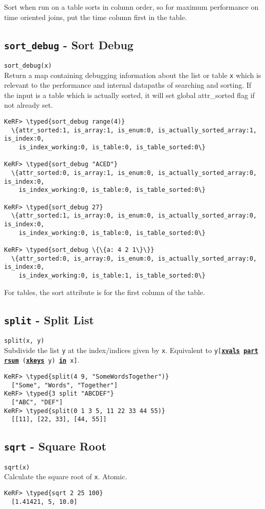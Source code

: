 \documentclass{article}
\newcommand{\typed}[1]{\textcolor{TealBlue}{#1}}
\newcommand{\primdefu}[3]{\subsection{\texttt{#1} - #2}\label{prim:#3}}
\newcommand{\primu}[2]{\hyperref[prim:#2]{\textbf{\texttt{#1}}}}
\newcommand{\primdef}[2]{\primdefu{#1}{#2}{#1}}
\newcommand{\prim}[1]{\primu{#1}{#1}}
\begin{document}
Sort when run on a table sorts in column order, so for maximum performance on time oriented joins, put the time column first in the table.

\pagebreak
\primdefu{sort\_debug}{Sort Debug}{sortDebug}
\texttt{sort\_debug(x)}\\

Return a map containing debugging information about the list or table \texttt{x} which is relevant to the performance and internal datapaths of searching and sorting. If the input is a table which is actually sorted, it will set global attr\_sorted flag if not already set.

\begin{Verbatim}
KeRF> \typed{sort_debug range(4)}
  \{attr_sorted:1, is_array:1, is_enum:0, is_actually_sorted_array:1, is_index:0,
    is_index_working:0, is_table:0, is_table_sorted:0\}

KeRF> \typed{sort_debug "ACED"}
  \{attr_sorted:0, is_array:1, is_enum:0, is_actually_sorted_array:0, is_index:0,
    is_index_working:0, is_table:0, is_table_sorted:0\}

KeRF> \typed{sort_debug 27}
  \{attr_sorted:1, is_array:0, is_enum:0, is_actually_sorted_array:0, is_index:0,
    is_index_working:0, is_table:0, is_table_sorted:0\}

KeRF> \typed{sort_debug \{\{a: 4 2 1\}\}}
  \{attr_sorted:0, is_array:0, is_enum:0, is_actually_sorted_array:0, is_index:0,
    is_index_working:0, is_table:1, is_table_sorted:0\}
\end{Verbatim}

For tables, the sort attribute is for the first column of the table.

\primdef{split}{Split List}
\texttt{split(x, y)}\\

Subdivide the list \texttt{y} at the index/indices given by \texttt{x}. Equivalent to \texttt{y[\prim{xvals} \prim{part} \prim{rsum} (\prim{xkeys} y) \prim{in} x]}.

\begin{Verbatim}
KeRF> \typed{split(4 9, "SomeWordsTogether")}
  ["Some", "Words", "Together"]
KeRF> \typed{3 split "ABCDEF"}
  ["ABC", "DEF"]
KeRF> \typed{split(0 1 3 5, 11 22 33 44 55)}
  [[11], [22, 33], [44, 55]]
\end{Verbatim}

\primdef{sqrt}{Square Root}
\texttt{sqrt(x)}\\

Calculate the square root of \texttt{x}. Atomic.
\begin{Verbatim}
KeRF> \typed{sqrt 2 25 100}
  [1.41421, 5, 10.0]
\end{Verbatim}
\end{document}
